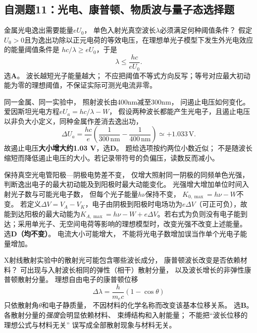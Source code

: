 
\subsection{自测题11：光电、康普顿、物质波与量子态选择题}

\problemtext 金属光电逸出需要能量$eU_0$，
单色入射光真空波长$\lambda$必须满足何种阈值条件？
\workings
假定$U_0>0$且为逸出功除以正元电荷的等效电压，在理想单光子模型下发生外光电效应的能量阈值条件是
$hc/\lambda\ge eU_0$，于是
\[
\boxed{\lambda\le\frac{hc}{eU_0}}.
\]
选\textbf{A}。
\crosscheck 波长越短光子能量越大；
不应把阈值不等式方向反写；等号对应最大初动能为零的理想阈值，不保证实际可测光电流非零。

\problemtext 同一金属、同一实验中，
照射波长由400nm减至300nm，
问遏止电压如何变化。
\workings
爱因斯坦光电方程$eU_a=hc/\lambda-W$，
假设两种波长都能产生光电子，且遏止电压以非负大小定义，同种金属作差消去逸出功，
\[
\Delta U_a=\frac{hc}{e}
\left(\frac1{300\,\mathrm{nm}}-\frac1{400\,\mathrm{nm}}\right)
\simeq\boxed{+1.033\,\mathrm V}.
\]
故遏止电压\textbf{大小增大约1.03 V}，选\textbf{D}。
\crosscheck 题给选项按约两位小数近似；
不是随波长缩短而降低遏止电压的大小。若记录带符号的负偏压，读数反而减小。

\problemtext 保持真空光电管阳极—阴极电势差不变，
仅增大照射同一阴极的同频单色光强，
判断逸出电子的最大初动能及到阳极时最大动能变化。
\workings
光强增大增加单位时间入射光子数与可能光电子数，
但每个光子能量$h\nu$保持不变，
$\boxed{K_{0,\max}=h\nu-W}$不变。
若定义$\Delta V=V_A-V_K$，电子由阴极到阳极时电场功为$e\Delta V$（可正可负），故能到达阳极的最大动能为$K_{A,\max}=h\nu-W+e\Delta V$。若右式为负则没有电子能到达；采用单光子、无空间电荷等影响的理想模型时，改变光强不改变上述能量。
选\textbf{D（均不变）}。
\crosscheck 电流大小可能增大，
不能将光电子数增加误当作单个光电子能量增加。

\problemtext X射线散射实验中的散射光可能包含哪些波长成分，
康普顿波长改变是否依赖材料？
\workings
可出现与入射波长相同的弹性（相干）散射分量，
以及波长增长的非弹性康普顿散射分量。
理想自由电子的康普顿位移
\[
\boxed{\Delta\lambda=\frac{h}{m_ec}(1-\cos\theta)}
\]
只依散射角$\theta$和电子静质量，
不因材料的化学名称而改变该基本位移关系。
选\textbf{B}。
\crosscheck 各散射分量的\emph{强度}会明显依赖材料、
束缚结构和入射能量；
不能把“波长位移的理想公式与材料无关”
误写成全部散射现象与材料无关。

